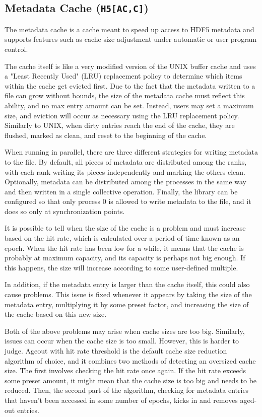 \subsection{Metadata Cache (\texttt{H5[AC,C]})}


The metadata cache is a cache meant to speed up access to HDF5 metadata and supports features such as cache size adjustment under automatic or user program control.

The cache itself is like a very modified version of the UNIX buffer cache and uses a "Least Recently Used" (LRU) replacement policy to determine which items within the cache get evicted first. Due to the fact that the metadata written to a file can grow without bounds, the size of the metadata cache must reflect this ability, and no max entry amount can be set. Instead, users may set a maximum size, and eviction will occur as necessary using the LRU replacement policy. Similarly to UNIX, when dirty entries reach the end of the cache, they are flushed, marked as clean, and reset to the beginning of the cache.

When running in parallel, there are three different strategies for writing metadata to the file. By default, all pieces of metadata are distributed among the ranks, with each rank writing its pieces independently and marking the others clean. Optionally, metadata can be distributed among the processes in the same way and then written in a single collective operation. Finally, the library can be configured so that only process 0 is allowed to write metadata to the file, and it does so only at synchronization points.

It is possible to tell when the size of the cache is a problem and must increase based on the hit rate, which is calculated over a period of time known as an epoch. When the hit rate has been low for a while, it means that the cache is probably at maximum capacity, and its capacity is perhaps not big enough. If this happens, the size will increase according to some user-defined multiple.

In addition, if the metadata entry is larger than the cache itself, this could also cause problems. This issue is fixed whenever it appears by taking the size of the metadata entry, multiplying it by some preset factor, and increasing the size of the cache based on this new size.

Both of the above problems may arise when cache sizes are too big. Similarly, issues can occur when the cache size is too small. However, this is harder to judge. Ageout with hit rate threshold is the default cache size reduction algorithm of choice, and it combines two methods of detecting an oversized cache size. The first involves checking the hit rate once again. If the hit rate exceeds some preset amount, it might mean that the cache size is too big and needs to be reduced. Then, the second part of the algorithm, checking for metadata entries that haven't been accessed in some number of epochs, kicks in and removes aged-out entries.

